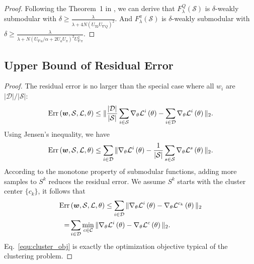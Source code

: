 \begin{proof}
Following the Theorem~1 in \cite{elenberg2018restricted}, we can derive that $F_\lambda^Q(\mathcal{S})$ is $\delta$-weakly submodular with $\delta \geq \frac{\lambda}{\lambda+4 N (U_\mathtt{TD}U_{\nabla Q})^2}$. 
And $F_\lambda^\pi(\mathcal{S})$ is $\delta$-weakly submodular with $\delta \geq \frac{\lambda}{\lambda + N(U_{\nabla a}/\alpha+2U_a U_\pi)^2 U_{\nabla\pi}^2}$.
\end{proof}

\subsection{Upper Bound of Residual Error}
\label{appendix: cluster theory}

\cluster*

\begin{proof}
The residual error is no larger than the special case where all $w_i$ are $|\mathcal{D}|/|\mathcal{S}|$:
\begin{align}
\operatorname{Err}\left({\bm{w}}, \mathcal{S}, \mathcal L, \theta\right)\le\|\frac{|\mathcal D|}{|\mathcal S|}\sum_{i\in \mathcal S}\nabla_{\theta} \mathcal L^i\left(\theta\right) - \sum_{i\in \mathcal D}\nabla_{\theta} \mathcal L^i\left(\theta\right) \|_2. \nonumber
\end{align}
Using Jensen's inequality, we have
\begin{align}
\operatorname{Err}\left({\bm{w}}, \mathcal{S}, \mathcal L, \theta\right)\le\sum_{i\in \mathcal D} \|\nabla_{\theta} \mathcal L^i\left(\theta\right) - \frac{1}{|\mathcal S|}\sum_{s\in\mathcal S}\nabla_{\theta}\mathcal L^s\left(\theta\right) \|_2. \nonumber
\end{align}
According to the monotone property of submodular functions, adding more samples to $S^k$ reduces the residual error. We assume $S^k$ starts with the cluster center $\{c_k\}$, it follows that
    \begin{align}
    \operatorname{Err}&\left({\bm{w}}, \mathcal{S}, \mathcal L, \theta\right) \le \sum_{i\in \mathcal D}\|\nabla_{\theta} \mathcal L^i\left(\theta\right) - \nabla_{\theta}\mathcal L^{c_k}\left(\theta\right) \|_2\nonumber\\
    =& \sum_{i\in\mathcal D} \min_{c\in \mathcal C}\|\nabla_{\theta} \mathcal L^i\left(\theta\right) - \nabla_{\theta} \mathcal L^c\left(\theta\right) \|_2.\label{equ:cluster_obj}
\end{align}
Eq.~\ref{equ:cluster_obj} is exactly the optimization objective typical of the clustering problem.
\end{proof}

